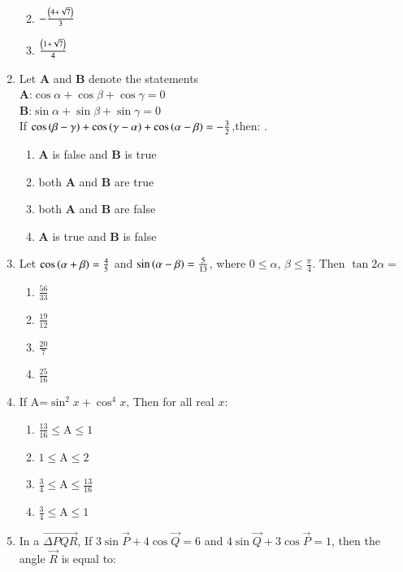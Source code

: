\documentclass[journal,12pt,twocolumn]{IEEEtran}
\theoremstyle{remark}
\begin{document}
\begin{enumerate}
\begin{multicols}{2}
\begin{enumerate}
\columnbreak
\item $-\frac{\left(4+\sqrt{7}\right)}{3}$
\item $\frac{\left(1+\sqrt{7}\right)}{4}$
\end{enumerate} 
\end{multicols}
\item Let \textbf{A} and \textbf{B} denote the statements
\\ \textbf{A}:$\cos\alpha+\cos\beta+\cos\gamma=0$
\\ \textbf{B}:$\sin\alpha+\sin\beta+\sin\gamma=0$
\\If $\cos\left(\beta-\gamma\right)+\cos\left(\gamma-\alpha\right)+\cos\left(\alpha-\beta\right)=-\frac{3}{2}$,then:
.\hfill{}
\begin{enumerate}
\item \textbf{A} is false and \textbf{B} is true 
\item both \textbf{A} and \textbf{B} are true
\item both \textbf{A} and \textbf{B} are false 
\item \textbf{A} is true and \textbf{B} is false
\end{enumerate}
\item Let $\cos\left(\alpha+\beta\right)=\frac{4}{5}$  and $\sin\left(\alpha-\beta\right)=\frac{5}{13}$, where $0\le\alpha$, $\beta\le\frac{\pi}{4}$. Then $\tan2\alpha=$ \hfill{}
\begin{multicols}{4}
\begin{enumerate}
\item $\frac{56}{33}$
\columnbreak
\item $\frac{19}{12}$
\columnbreak
\item $\frac{20}{7}$
\columnbreak
\item $\frac{25}{16}$
\end{enumerate} 
\end{multicols}
\item If A=$\sin^2x +\cos^4 x$, Then for all real $x$:
\hfill{}
\begin{multicols}{2} 
\begin{enumerate}
\item $\frac{13}{16}\le$A$\le1$
\item $1\le$A$\le2$
\columnbreak
\item $\frac{3}{4}\le$A$\le\frac{13}{16}$
\item $\frac{3}{4}\le$A$\le1$
\end{enumerate} 
\end{multicols}
\item In a $\vec{\Delta PQR}$, If $3 \sin \vec{P} + 4 \cos \vec{Q}=6$ and $4\sin \vec{Q}+3\cos \vec{P}=1$, then the angle $\vec{R}$ is equal to:

\end{enumerate}
\end{document}

